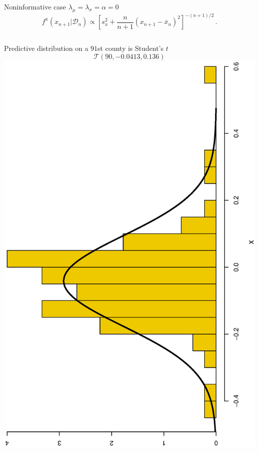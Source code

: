 \begin{slide}
\end{slide}\begin{slide}

Noninformative case $\lambda_\mu=\lambda_\sigma=\alpha=0$ 
$$
f^\pi(x_{n+1}|\mathscr{D}_n)\propto
\left[s_x^2+\frac{n}{n+1}(x_{n+1}-\overline x_n)^2\right]^{-(n+1)/2}\,.
$$

\begin{columns}
Predictive distribution on a $91$st county 
is Student's $t$ 
$$
\mathscr{T}(90,-0.0413,0.136)
$$
\includegraphics[width=4truecm,angle=270]{figures/predt}
\end{columns}
\end{slide}

